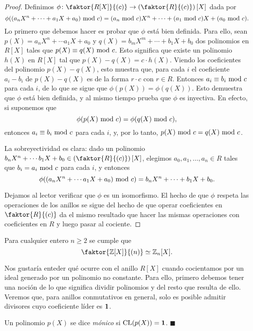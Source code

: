 \begin{proof}
Definimos $\phi\colon \faktor{R[X]}{(c)} \rightarrow \left( \faktor{R}{(c)} \right)[X]$ dada por
$$\phi((a_nX^n + \cdots + a_1X + a_0) \modu c) = (a_n \modu c)X^n + \cdots + (a_1 \modu c)X + (a_0 \modu c).$$
Lo primero que debemos hacer es probar que $\phi$ está bien definida. Para ello, sean $p(X) = a_nX^n + \cdots a_1X + a_0$ y $q(X) = b_mX^m + \cdots + b_1X + b_0$ dos polinomios en $R[X]$ tales que $p(X) \equiv q(X) \!\! \mod c$. Esto significa que existe un polinomio $h(X)$ en $R[X]$ tal que $p(X) - q(X) = c \cdot h(X)$. Viendo los coeficientes del polinomio $p(X)- q(X)$, esto muestra que, para cada $i$ el coeficiente $a_i - b_i$ de $p(X)-q(X)$ es de la forma $r \cdot c$ con $r \in R$. Entonces $a_i \equiv b_i \!\! \mod c$ para cada $i$, de lo que se sigue que $\phi(p(X)) = \phi(q(X))$. Esto demuestra que $\phi$ está bien definida, y al mismo tiempo prueba que $\phi$ es inyectiva. En efecto, si suponemos que $$\phi(p(X) \!\! \mod c) = \phi(q(X) \!\! \mod c),$$ entonces $a_i \equiv b_i \!\! \mod c$ para cada $i$, y, por lo tanto, $p(X) \!\! \mod c = q(X) \!\! \mod c$.

La sobreyectividad es clara: dado un polinomio $b_nX^n + \cdots b_1X + b_0 \in \left( \faktor{R}{(c)} \right)[X]$, elegimos $a_0, a_1, \dots, a_n \in R$ tales que $b_i = a_i \!\! \mod c$ para cada $i$, y entonces
$$\phi((a_nX^n + \cdots a_1X+a_0) \!\! \mod c) = b_nX^n + \cdots + b_1X+b_0.$$

Dejamos al lector verificar que $\phi$ es un isomorfismo. El hecho de que $\phi$ respeta las operaciones de los anillos se sigue del hecho de que operar coeficientes en $\faktor{R}{(c)}$ da el mismo resultado que hacer las mismas operaciones con coeficientes en $R$ y luego pasar al cociente.
\end{proof}

\begin{corollary} 
Para cualquier entero $n \geq 2$ se cumple que
$$\faktor{\mathbb{Z}[X]}{(n)} \simeq \mathbb{Z}_n[X].$$
\end{corollary}

Nos gustaría enteder qué ocurre con el anillo $R[X]$ cuando cocientamos por un ideal generado por un polinomio no constante. Para ello, primero debemos tener una noción de lo que significa dividir polinomios y del resto que resulta de ello. Veremos que, para anillos conmutativos en general, solo es posible admitir divisores cuyo coeficiente líder es $\mathbf{1}$.

\begin{definition}
Un polinomio $p(X)$ se dice \emph{mónico} si $\mathrm{CL}(p(X)) = \mathbf{1}$. \hfill$\blacksquare$
\end{definition}

